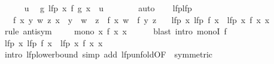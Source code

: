 \begin{isabellebody}
\ \ \ \ \isamarkupfalse%
\ u\ \isamarkupfalse%
\ {\isachardoublequoteopen}g\ {\isacharparenleft}{\kern0pt}lfp\ {\isacharparenleft}{\kern0pt}{\isasymlambda}x{\isachardot}{\kern0pt}\ f\ {\isacharparenleft}{\kern0pt}g\ x{\isacharparenright}{\kern0pt}{\isacharparenright}{\kern0pt}{\isacharparenright}{\kern0pt}\ {\isasymle}\ u{\isachardoublequoteclose}\isanewline
\ \ \ \ \ \ \isamarkupfalse%
\ auto\isanewline
\ \ \isamarkupfalse%
\isanewline
{}\isamarkupfalse%
%
\endisatagproof
{\isafoldproof}%
%
\isadelimproof
\isanewline
%
\endisadelimproof
\isanewline
{}\isamarkupfalse%
\ lfp{\isacharunderscore}{\kern0pt}lfp{\isacharcolon}{\kern0pt}\isanewline
\ \ \ f{\isacharcolon}{\kern0pt}\ {\isachardoublequoteopen}{\isasymAnd}x\ y\ w\ z{\isachardot}{\kern0pt}\ x\ {\isasymle}\ y\ {\isasymLongrightarrow}\ w\ {\isasymle}\ z\ {\isasymLongrightarrow}\ f\ x\ w\ {\isasymle}\ f\ y\ z{\isachardoublequoteclose}\isanewline
\ \ \ {\isachardoublequoteopen}lfp\ {\isacharparenleft}{\kern0pt}{\isasymlambda}x{\isachardot}{\kern0pt}\ lfp\ {\isacharparenleft}{\kern0pt}f\ x{\isacharparenright}{\kern0pt}{\isacharparenright}{\kern0pt}\ {\isacharequal}{\kern0pt}\ lfp\ {\isacharparenleft}{\kern0pt}{\isasymlambda}x{\isachardot}{\kern0pt}\ f\ x\ x{\isacharparenright}{\kern0pt}{\isachardoublequoteclose}\isanewline
%
\isadelimproof
%
\endisadelimproof
%
\isatagproof
{}\isamarkupfalse%
\ {\isacharparenleft}{\kern0pt}rule\ antisym{\isacharparenright}{\kern0pt}\isanewline
\ \ \isamarkupfalse%
\ {\isacharasterisk}{\kern0pt}{\isacharcolon}{\kern0pt}\ {\isachardoublequoteopen}mono\ {\isacharparenleft}{\kern0pt}{\isasymlambda}x{\isachardot}{\kern0pt}\ f\ x\ x{\isacharparenright}{\kern0pt}{\isachardoublequoteclose}\isanewline
\ \ \ \ \isamarkupfalse%
\ {\isacharparenleft}{\kern0pt}blast\ intro{\isacharcolon}{\kern0pt}\ monoI\ f{\isacharparenright}{\kern0pt}\isanewline
\ \ \isamarkupfalse%
\ {\isachardoublequoteopen}lfp\ {\isacharparenleft}{\kern0pt}{\isasymlambda}x{\isachardot}{\kern0pt}\ lfp\ {\isacharparenleft}{\kern0pt}f\ x{\isacharparenright}{\kern0pt}{\isacharparenright}{\kern0pt}\ {\isasymle}\ lfp\ {\isacharparenleft}{\kern0pt}{\isasymlambda}x{\isachardot}{\kern0pt}\ f\ x\ x{\isacharparenright}{\kern0pt}{\isachardoublequoteclose}\isanewline
\ \ \ \ \isamarkupfalse%
\ {\isacharparenleft}{\kern0pt}intro\ lfp{\isacharunderscore}{\kern0pt}lowerbound{\isacharparenright}{\kern0pt}\ {\isacharparenleft}{\kern0pt}simp\ add{\isacharcolon}{\kern0pt}\ lfp{\isacharunderscore}{\kern0pt}unfold{\isacharbrackleft}{\kern0pt}OF\ {\isacharasterisk}{\kern0pt}{\isacharcomma}{\kern0pt}\ symmetric{\isacharbrackright}{\kern0pt}{\isacharparenright}{\kern0pt}\isanewline

\end{isabellebody}
